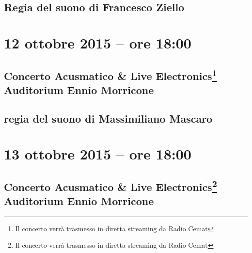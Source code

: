 \documentclass[8pt, twoside, a5paper]{extreport}
\begin{document}
{\fontsize{30}{30} }

\subsection*{\textsf{Regia del suono di Francesco Ziello}}

\bigskip

\begin{multicols}{2}

%


\end{multicols}

\clearpage

\section*{12 ottobre 2015 -- ore 18:00}

\subsection*{{\small Concerto Acusmatico \& Live Electronics\footnote{ Il concerto verrà trasmesso in diretta streaming da Radio Cemat}} \\
	\textsf{Auditorium Ennio Morricone}}

{\fontsize{30}{30} }

\subsection*{\textsf{regia del suono di Massimiliano Mascaro}}

\bigskip

\begin{multicols}{2}

%


\end{multicols}

\clearpage

\section*{13 ottobre 2015 -- ore 18:00}

\subsection*{{\small Concerto Acusmatico \& Live Electronics\footnote{ Il concerto verrà trasmesso in diretta streaming da Radio Cemat}} \\
	\textsf{Auditorium Ennio Morricone}}
\end{document}

